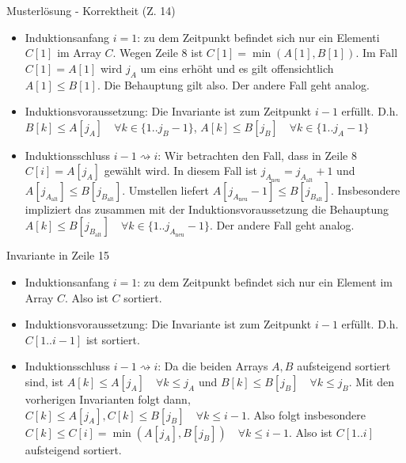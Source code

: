 \documentclass[18pt]{beamer}
\begin{document}
\begin{frame}{Musterlösung - Korrektheit (Z. 14)}
\begin{itemize}
 \item Induktionsanfang $i=1$: zu dem Zeitpunkt befindet sich nur ein Elementi $C[1]$ im Array $C$. Wegen Zeile 8 ist $C[1] = \min(A[1],B[1])$. Im Fall $C[1] = A[1]$ wird $j_A$ um eins erhöht und es gilt offensichtlich $A[1] \leq B[1]$. Die Behauptung gilt also. Der andere Fall geht analog.
 \item Induktionsvoraussetzung: Die Invariante ist zum Zeitpunkt $i-1$ erfüllt. D.h. $B[k] \leq A[j_A] \quad  \forall k \in \{1..j_B-1\}$, $A[k] \leq B[j_B]\quad  \forall k \in \{1..j_A-1\}$
 \item Induktionsschluss $i-1 \rightsquigarrow i$: Wir betrachten den Fall, dass in Zeile 8 $C[i] =  A[j_A]$ gewählt wird. In diesem Fall ist $j_{A_{\text{neu}}} = j_{A_{\text{alt}}} +1 $ und $A[j_{A_{\text{alt}}}] \leq B[j_{B_{\text{alt}}}]$. Umstellen liefert  $A[j_{A_{\text{neu}}}-1] \leq B[j_{B_{\text{alt}}}]$.
	Insbesondere impliziert das zusammen mit der Induktionsvoraussetzung die Behauptung $A[k] \leq B[j_{B_\text{alt}}]\quad  \forall k \in \{1..j_{A_{\text{neu}}}-1\}$. Der andere Fall geht analog.  
\end{itemize}

	
        
	
\end{frame}
\begin{frame}{Invariante in  Zeile 15}
\begin{itemize}
 \item Induktionsanfang $i=1$: zu dem Zeitpunkt befindet sich nur ein Element im Array $C$. Also ist $C$ sortiert. \\
 \item Induktionsvoraussetzung: Die Invariante ist zum Zeitpunkt $i-1$ erfüllt. D.h. $C[1..i-1]$ ist sortiert.\\
 \item 	Induktionsschluss $i-1 \rightsquigarrow i$: Da die beiden Arrays $A, B$ aufsteigend sortiert sind, ist $A[k] \leq A[j_A] \quad \forall k \leq  j_A$ und $B[k] \leq B[j_B] \quad \forall k \leq j_B$. Mit den vorherigen Invarianten folgt dann, $C[k] \leq A[j_A], C[k] \leq B[j_B] \quad 	\forall k \leq i-1$. Also folgt insbesondere $C[k] \leq C[i] = \min(A[j_A],B[j_B]) \quad \forall k \leq i-1 $. Also ist $C[1..i]$ aufsteigend sortiert.

\end{itemize}
\end{frame}
\end{document}
